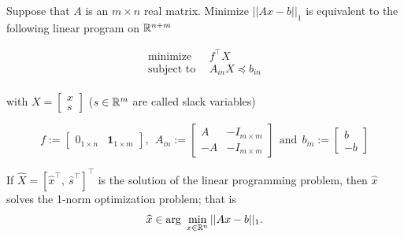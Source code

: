 \begin{tcolorbox}[title = Linear Program for ${ \bf\ell}_1$-\textbf{norm:} {$||x||_1 = \sum_{i=1}^{n} |x_i|$}]

Suppose that $A$ is an $m \times n$ real matrix. Minimize $||Ax - b||_1$ is equivalent to the following linear program on $\mathbb R^{n+m}$

\begin{equation}
\label{eq:ell1normviaLP}
\begin{aligned}
\text{minimize}& ~~ f^\top X\\
\text{subject to} &~~A_{in} X \preceq b_{in} \\
\end{aligned}
\end{equation}

with $X = \left[\begin{array}{c}  x\\ s \end{array} \right]$ ($s\in \mathbb R^m$ are called slack variables)


$$f:=\left[ \begin{array}{cc}0_{1 \times n} & \textbf{1}_{1 \times m} \end{array} \right],~~A_{in}:= \left[ \begin{array}{rr}  A  & -I_{m \times m}  \\
 -A  & -I_{m \times m}\end{array} \right] ~~\text{and}~~ b_{in}:=\left[\begin{array}{r}  b\\ -b \end{array} \right]$$

If $\widehat{X}=[\widehat{x}^\top, ~ \widehat{s}^\top ]^\top $  is the solution of the linear programming problem, then $\widehat{x}$ solves the 1-norm optimization problem; that is
$$ \widehat{x} \in {\rm arg}~\min_{x \in \mathbb R^n} ||Ax - b||_1.$$
 \end{tcolorbox}
 
 \vspace*{.2cm}

